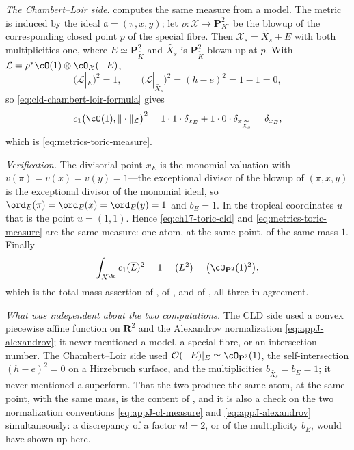 \begin{example}
\emph{The Chambert--Loir side.}   computes
the same measure from a model.  The metric is induced by the ideal
$\mathfrak a=(\pi,x,y)$; let $\rho:\mathcal X\to\mathbf P^2_{K^\circ}$
be the blowup of the corresponding closed point $p$ of the special fibre.
Then $\mathcal X_s=\widetilde{X_s}+E$ with both multiplicities one, where
$E\simeq\mathbf P^2_{\widetilde K}$ and $\widetilde{X_s}$ is
$\mathbf P^2_{\widetilde K}$ blown up at $p$.  With
$\mathcal L=\rho^*\cO(1)\otimes\cO_{\mathcal X}(-E)$,
\[
 \bigl(\mathcal L|_E\bigr)^2=1,
 \qquad
 \bigl(\mathcal L|_{\widetilde{X_s}}\bigr)^2=(h-e)^2=1-1=0,
\]
so \eqref{eq:cld-chambert-loir-formula} gives
\[
 c_1\bigl(\cO(1),\|\cdot\|_{\mathcal L}\bigr)^2
 =1\cdot1\cdot\delta_{x_E}+1\cdot0\cdot\delta_{x_{\widetilde{X_s}}}
 =\delta_{x_E},
\]
which is \eqref{eq:metrics-toric-measure}.

\emph{Verification.}  The divisorial point $x_E$ is the monomial
valuation with $v(\pi)=v(x)=v(y)=1$---the exceptional divisor of the
blowup of $(\pi,x,y)$ is the exceptional divisor of the monomial ideal, so
$\ord_E(\pi)=\ord_E(x)=\ord_E(y)=1$ and $b_E=1$.  In the tropical
coordinates $u$ that is the point $u=(1,1)$.  Hence
\eqref{eq:ch17-toric-cld} and \eqref{eq:metrics-toric-measure} are the same
measure: one atom, at the same point, of the same mass $1$.  Finally
\[
 \int_{X^{\An}}c_1(\overline L)^2=1=(L^2)=\bigl(\cO_{\mathbf P^2}(1)^2\bigr),
\]
which is the total-mass assertion of , of
, and of , all three in
agreement.

\emph{What was independent about the two computations.}  The CLD side used a
convex piecewise affine function on $\mathbf R^2$ and the Alexandrov
normalization \eqref{eq:appJ-alexandrov}; it never mentioned a model, a
special fibre, or an intersection number.  The Chambert--Loir side used
$\mathcal O(-E)|_E\simeq\cO_{\mathbf P^2}(1)$, the self-intersection
$(h-e)^2=0$ on a Hirzebruch surface, and the multiplicities
$b_{\widetilde{X_s}}=b_E=1$; it never mentioned a superform.  That the two
produce the same atom, at the same point, with the same mass, is the content
of , and it is also a check on the two
normalization conventions \eqref{eq:appJ-cl-measure} and
\eqref{eq:appJ-alexandrov} simultaneously: a discrepancy of a factor
$n!=2$, or of the multiplicity $b_E$, would have shown up here.


\end{example}
